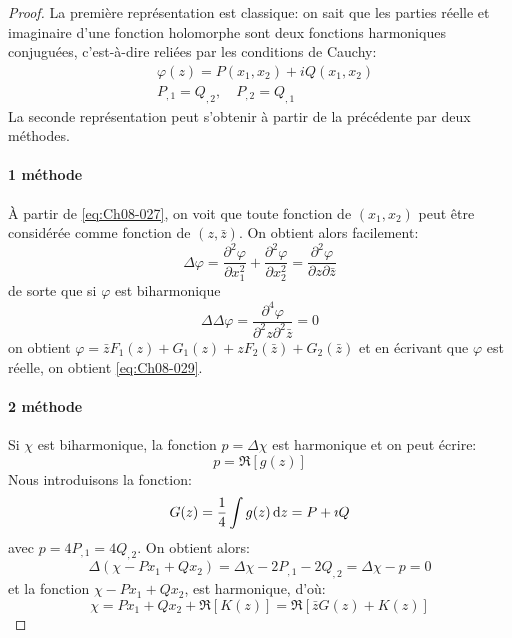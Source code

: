 \begin{proof}
La première représentation est classique: on sait que les parties réelle et imaginaire d'une fonction holomorphe sont deux fonctions harmoniques conjuguées, c'est-à-dire reliées par les conditions de Cauchy: 
\begin{equation}
    \begin{aligned}
       & \varphi(z)=P(x_1,x_2)+i Q(x_1,x_2) \\
       & P_{,1}=Q_{,2}, \quad P_{,2}=Q_{,1}
    \end{aligned}
    \label{eq:Ch08-030}
\end{equation}
La seconde représentation peut s'obtenir à partir de la précédente par deux méthodes.
\paragraph{1 méthode} À partir de \eqref{eq:Ch08-027}, on voit que toute fonction de $(x_1,x_2)$ peut être considérée comme fonction de $(z,\bar{z})$. 
On obtient alors facilement: 
\begin{equation*}
  \Delta \varphi = \frac{\partial^2\varphi}{\partial x_1^2} + \frac{\partial^2\varphi}{\partial x_2^2} = \frac{\partial^2\varphi}{\partial z \partial \bar{z}}
\end{equation*}
de sorte que si $\varphi$ est biharmonique
\begin{equation*}
  \Delta\Delta\varphi=\frac{\partial^4\varphi}{\partial^2 z \partial^2 \bar{z}}=0
\end{equation*}
on obtient $\varphi=\bar{z}F_1(z)+G_1(z)+zF_2(\bar{z})+G_2(\bar{z})$
et en écrivant que $\varphi$ est réelle, on obtient \eqref{eq:Ch08-029}.
\paragraph{2 méthode} Si $\chi$ est biharmonique, la fonction $p=\Delta\chi$ est harmonique et on peut écrire: 
\begin{equation*}
    p=\Re \left[ g(z)\right]
\end{equation*}
Nous introduisons la fonction: 
\begin{equation*}
    G(z) = \frac{1}{4}\int g(z) \mathop{\mathrm{{}d}}\mathopen{} z = P + \imath Q
\end{equation*}
avec $p=4P_{,1}=4Q_{,2}$.
On obtient alors: 
\begin{equation*}
    \Delta (\chi - Px_1 + Qx_2) = \Delta\chi - 2P_{,1} - 2Q_{,2} = \Delta\chi - p = 0
\end{equation*}
et la fonction $\chi - Px_1 + Qx_2$, est harmonique, d'où:
\begin{equation*}
        \chi  = Px_1 + Qx_2 + \Re \left[ K(z)\right] = \Re \left[ \bar{z}G(z) + K(z) \right]
\end{equation*}
\end{proof}
